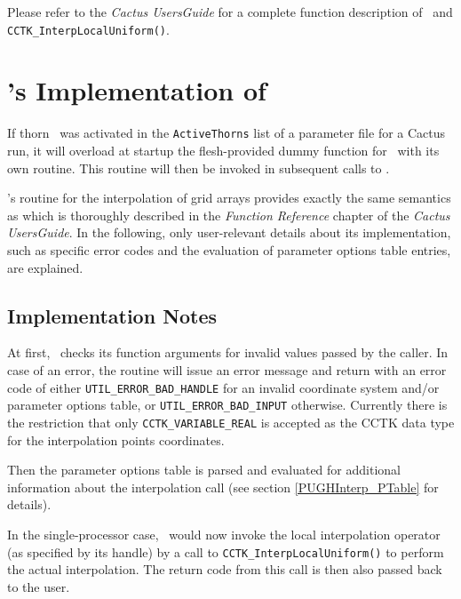 \documentclass{article}
\begin{document}
Please refer to the {\it Cactus UsersGuide} for a complete function description
of \InterpGridArrays\ and {\tt CCTK\_InterpLocalUniform()}.\\


\section{\PUGHInterp's Implementation of \InterpGridArrays}

If thorn \PUGHInterp\ was activated in the {\tt ActiveThorns} list of a
parameter file for a Cactus run, it will overload at startup the flesh-provided
dummy function for \InterpGridArrays\ with its own routine. This routine will
then be invoked in subsequent calls to \InterpGridArrays.

\PUGHInterp's routine for the interpolation of grid arrays provides exactly the
same semantics as \InterpGridArrays which is thoroughly described in the
{\it Function Reference} chapter of the {\it Cactus UsersGuide}.
In the following, only user-relevant details about its implementation, such as
specific error codes and the evaluation of parameter options table entries, are
explained.

\subsection{Implementation Notes}

At first, \InterpGridArrays\ checks its function arguments for invalid values
passed by the caller. In case of an error, the routine will issue an error
message and return with an error code of either {\tt UTIL\_\-ERROR\_\-BAD\_\-HANDLE} for
an invalid coordinate system and/or parameter options table, or
{\tt UTIL\_ERROR\_BAD\_INPUT} otherwise.
Currently there is the restriction that only {\tt CCTK\_VARIABLE\_REAL} is
accepted as the CCTK data type for the interpolation points coordinates.

Then the parameter options table is parsed and evaluated for additional
information about the interpolation call (see section \ref{PUGHInterp_PTable}
for details).

In the single-processor case, \InterpGridArrays\ would now invoke the local
interpolation operator (as specified by its handle) by a call to
{\tt CCTK\_InterpLocalUniform()} to perform the actual interpolation. The return
code from this call is then also passed back to the user.
\end{document}
